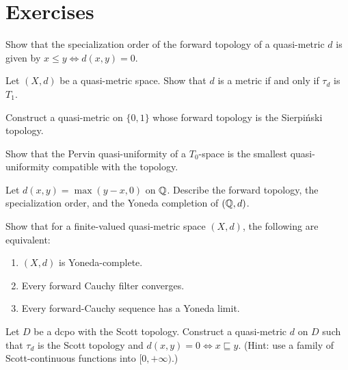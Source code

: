 \section{Exercises}

\begin{exercise}
Show that the specialization order of the forward topology of a quasi-metric $d$ is given
by $x \leq y \Leftrightarrow d(x,y) = 0$.
\end{exercise}

\begin{exercise}
Let $(X,d)$ be a quasi-metric space. Show that $d$ is a metric if and only if $\tau_d$ is
$T_1$.
\end{exercise}

\begin{exercise}
Construct a quasi-metric on $\{0,1\}$ whose forward topology is the Sierpi\'nski topology.
\end{exercise}

\begin{exercise}
Show that the Pervin quasi-uniformity of a $T_0$-space is the smallest quasi-uniformity
compatible with the topology.
\end{exercise}

\begin{exercise}[Completion of $\Q$]
Let $d(x,y) = \max(y-x, 0)$ on $\Q$. Describe the forward topology, the specialization
order, and the Yoneda completion of $(\mathbb{Q}, d)$.
\end{exercise}

\begin{exercise}
Show that for a finite-valued quasi-metric space $(X,d)$, the following are equivalent:
\begin{enumerate}
  \item $(X,d)$ is Yoneda-complete.
  \item Every forward Cauchy filter converges.
  \item Every forward-Cauchy sequence has a Yoneda limit.
\end{enumerate}
\end{exercise}

\begin{exercise}
Let $D$ be a dcpo with the Scott topology. Construct a quasi-metric $d$ on $D$ such that
$\tau_d$ is the Scott topology and $d(x,y) = 0 \Leftrightarrow x \sqsubseteq y$.
(Hint: use a family of Scott-continuous functions into $[0,+\infty)$.)
\end{exercise}
